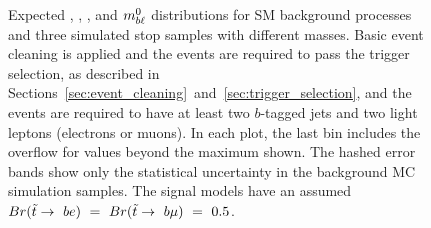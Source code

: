\begin{figure}
{  }
  \caption{Expected \MLL, \HT, \MBLASYM, and $m_{b\ell}^0$ distributions for SM
    background processes and three simulated stop samples with different masses.
    Basic event cleaning is applied and the events are required to pass the
    trigger selection, as described in
    Sections~\ref{sec:event_cleaning}~and~\ref{sec:trigger_selection}, and the
    events are required to have at least two $b$-tagged jets and two light
    leptons (electrons or muons).
    In each plot, the last bin includes the overflow for values beyond the
    maximum shown. The hashed error bands show only the statistical
    uncertainty in the background MC simulation samples. The signal
    models have an assumed
    $Br(\tilde{t}\rightarrow~be)~=~Br(\tilde{t}\rightarrow~b\mu)~=~0.5$.
  }
  \label{fig:no_data__no_k__inclusive_flavor_all__kinematic_dists}
\end{figure}

